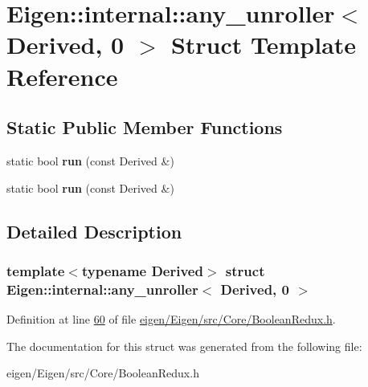 \hypertarget{struct_eigen_1_1internal_1_1any__unroller_3_01_derived_00_010_01_4}{}\section{Eigen\+:\+:internal\+:\+:any\+\_\+unroller$<$ Derived, 0 $>$ Struct Template Reference}
\label{struct_eigen_1_1internal_1_1any__unroller_3_01_derived_00_010_01_4}
\subsection*{Static Public Member Functions}
\begin{DoxyCompactItemize}
\item 
\mbox{\label{struct_eigen_1_1internal_1_1any__unroller_3_01_derived_00_010_01_4_ad3879ef2538193fffda30e6115e11fd4}} 
static bool {\bfseries run} (const Derived \&)
\item 
\mbox{\label{struct_eigen_1_1internal_1_1any__unroller_3_01_derived_00_010_01_4_ad3879ef2538193fffda30e6115e11fd4}} 
static bool {\bfseries run} (const Derived \&)
\end{DoxyCompactItemize}


\subsection{Detailed Description}
\subsubsection*{template$<$typename Derived$>$\newline
struct Eigen\+::internal\+::any\+\_\+unroller$<$ Derived, 0 $>$}



Definition at line \hyperlink{eigen_2_eigen_2src_2_core_2_boolean_redux_8h_source_l00060}{60} of file \hyperlink{eigen_2_eigen_2src_2_core_2_boolean_redux_8h_source}{eigen/\+Eigen/src/\+Core/\+Boolean\+Redux.\+h}.



The documentation for this struct was generated from the following file\+:\begin{DoxyCompactItemize}
\item 
eigen/\+Eigen/src/\+Core/\+Boolean\+Redux.\+h\end{DoxyCompactItemize}
